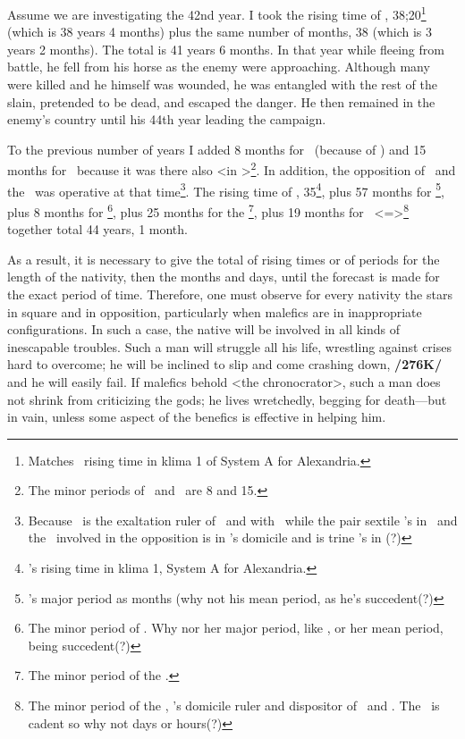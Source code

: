 Assume we are investigating the 42nd year. I took the rising time of \Libra, 38;20\footnote{Matches \Libra\, rising time in klima 1 of System A for Alexandria.} (which is 38 years 4 months) plus the same number of months, 38 (which is 3 years 2 months). The total is 41 years 6 months. In that year while fleeing from battle, he fell from his horse as the enemy were approaching. Although many were killed and he himself was wounded, he was entangled with the rest of the slain, pretended to be dead, and escaped the danger. He then remained in the enemy’s country until his 44th year leading the campaign. 

To the previous number of years I added 8 months for \Venus\, (because of \Libra) and 15 months for \Mars\, because it was there also <in \Libra>\footnote{The minor periods of \Venus\, and \Mars\, are 8 and 15.}. In addition, the opposition of \Saturn\, and the \Moon\, was operative at that time\footnote{Because \Saturn\, is the exaltation ruler of \Libra\, and with \Venus\, while the pair sextile \Mars's in \Libra\, and the \Moon\, involved in the opposition is in \Saturn's domicile and is trine \Mars's in \Libra(?)}. The rising time of \Leo, 35\footnote{\Leo's rising time in klima 1, System A for Alexandria.}, plus 57 months for \Saturn\footnote{\Saturn's major period as months (why not his mean period, as he's succedent(?)}, plus 8 months for \Venus\footnote{The minor period of \Venus. Why nor her major period, like \Saturn, or her mean period, being succedent(?)}, plus 25 months for the \Moon\footnote{The minor period of the \Moon.}, plus 19 months for \Leo\, <=\Sun>\footnote{The minor period of the \Sun, \Leo's domicile ruler and dispositor of \Saturn\, and \Venus. The \Sun\, is cadent so why not days or hours(?)} together total 44 years, 1 month. 

As a result, it is necessary to give the total of rising times or of periods for the length of the nativity, then the months and days, until the forecast is made for the exact period of time. \mndl Therefore, one must observe for every nativity the stars in square and in opposition, particularly when malefics are in inappropriate configurations. In such a case, the native will be involved in all kinds of inescapable troubles. Such a man will struggle all his life, wrestling against crises hard to overcome; he will be inclined to slip and come crashing down, \textbf{/276K/} and he will easily fail. If malefics behold <the chronocrator>, such a man does not shrink from criticizing the gods; he lives wretchedly, begging for death—but in vain, unless some aspect of the benefics is effective in helping him. 

